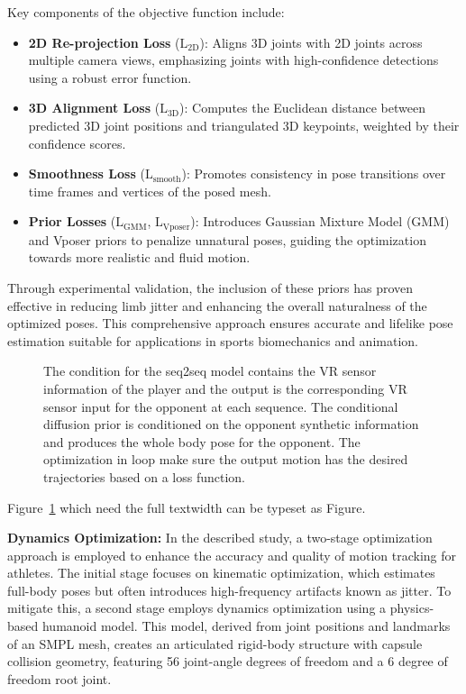 Key components of the objective function include:

\begin{itemize}
    \item \textbf{2D Re-projection Loss} ($\mathrm{L}_\text{2D}$): Aligns 3D joints with 2D joints across multiple camera views, emphasizing joints with high-confidence detections using a robust error function.
    \item \textbf{3D Alignment Loss} ($\mathrm{L}_\text{3D}$): Computes the Euclidean distance between predicted 3D joint positions and triangulated 3D keypoints, weighted by their confidence scores.
    \item \textbf{Smoothness Loss} ($\mathrm{L}_\text{smooth}$): Promotes consistency in pose transitions over time frames and vertices of the posed mesh.
    \item \textbf{Prior Losses} ($\mathrm{L}_{\text{GMM}}$, $\mathrm{L}_{\text{Vposer}}$): Introduces Gaussian Mixture Model (GMM) and Vposer priors to penalize unnatural poses, guiding the optimization towards more realistic and fluid motion.
\end{itemize}

Through experimental validation, the inclusion of these priors has proven effective in reducing limb jitter and enhancing the overall naturalness of the optimized poses. This comprehensive approach ensures accurate and lifelike pose estimation suitable for applications in sports biomechanics and animation.

\begin{figure}[htbp]
  \centering

  

  \caption{\label{fig:condtion-diffusion}
           The condition for the seq2seq model contains the VR sensor information of the player and the output is the corresponding VR sensor input for the opponent at each sequence. The conditional diffusion prior is conditioned on the opponent synthetic information and produces the whole body pose for the opponent. The optimization in loop make sure the output motion has the desired trajectories based on a loss function.}
\end{figure}

Figure~\ref{fig:condtion-diffusion} which need the full textwidth can be typeset as Figure.

\textbf{Dynamics Optimization:} In the described study, a two-stage optimization approach is employed to enhance the accuracy and quality of motion tracking for athletes. The initial stage focuses on kinematic optimization, which estimates full-body poses but often introduces high-frequency artifacts known as jitter. To mitigate this, a second stage employs dynamics optimization using a physics-based humanoid model. This model, derived from joint positions and landmarks of an SMPL mesh, creates an articulated rigid-body structure with capsule collision geometry, featuring 56 joint-angle degrees of freedom and a 6 degree of freedom root joint.

